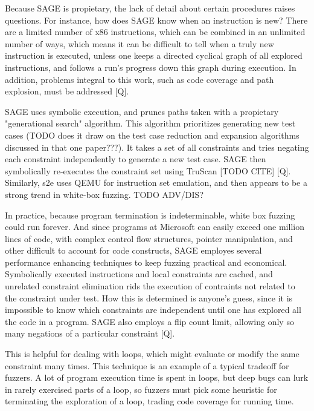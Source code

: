\documentclass[11pt,expanded,copyright]{fsuthesis}
\begin{document}
Because SAGE is propietary, the lack of detail about certain procedures raises questions. For instance, how does SAGE know when an instruction is new? There are a limited number of x86 instructions, which can be combined in an unlimited number of ways, which means it can be difficult to tell when a truly new instruction is executed, unless one keeps a directed cyclical graph of all explored instructions, and follows a run's progress down this graph during execution. In addition, problems integral to this work, such as code coverage and path explosion, must be addressed [Q].

SAGE uses symbolic execution, and prunes paths taken with a propietary "generational search" algorithm. This algorithm prioritizes generating new test cases (TODO does it draw on the test case reduction and expansion algorithms discussed in that one paper???). It takes a set of all constraints and tries negating each constraint independently to generate a new test case. SAGE then symbolically re-executes the constraint set using TruScan [TODO CITE] [Q]. Similarly, s2e uses QEMU for instruction set emulation, and then appears to be a strong trend in white-box fuzzing. TODO ADV/DIS?

In practice, because program termination is indeterminable, white box fuzzing could run forever. And since programs at Microsoft can easily exceed one million lines of code, with complex control flow structures, pointer manipulation, and other difficult to account for code constructs, SAGE employes several performance enhancing techniques to keep fuzzing practical and economical. Symbolically executed instructions and local constraints are cached, and unrelated constraint elimination rids the execution of contraints not related to the constraint under test. How this is determined is anyone's guess, since it is impossible to know which constraints are independent until one has explored all the code in a program. SAGE also employs a flip count limit, allowing only so many negations of a particular constraint [Q]. 

This is helpful for dealing with loops, which might evaluate or modify the same constraint many times. This technique is an example of a typical tradeoff for fuzzers. A lot of program execution time is spent in loops, but deep bugs can lurk in rarely exercised parts of a loop, so fuzzers must pick some heuristic for terminating the exploration of a loop, trading code coverage for running time.

\end{document}
